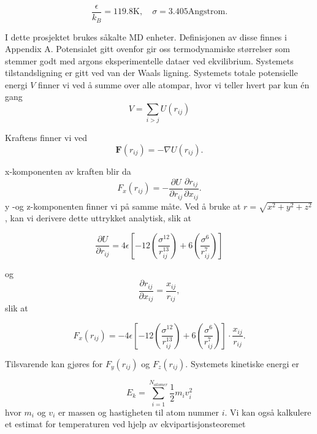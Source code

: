 \documentclass[paper=a4, fontsize=11pt]{scrartcl} %
\numberwithin{equation}{section} %
\numberwithin{figure}{section} %
\numberwithin{table}{section} %
\begin{document}
\begin{equation}
	\frac{\epsilon}{k_B} = 119.8\mathrm{K}, \quad \sigma=3.405 \mathrm{Angstrom}.
\end{equation}

I dette prosjektet brukes såkalte MD enheter. Definisjonen av disse finnes i Appendix A. Potensialet gitt ovenfor gir oss termodynamiske størrelser som stemmer godt med argons eksperimentelle dataer ved ekvilibrium. Systemets tilstandsligning er gitt ved van der Waals ligning. Systemets totale potensielle energi $V$ finner vi ved å summe over alle atompar, hvor vi teller hvert par kun én gang
\begin{equation}
V = \sum_{i>j} U(r_{ij})
\end{equation}

Kraftens  finner vi ved
\begin{equation}
\textbf{F}(r_{ij}) = - \nabla U(r_{ij}).
\end{equation}

x-komponenten av kraften blir da
\begin{equation}
F_x (r_{ij}) = -\frac{\partial U}{\partial r_{ij}} \frac{\partial r_{ij}}{\partial x_{ij}}.
\end{equation}
y -og z-komponenten finner vi på samme måte. Ved å bruke at $r = \sqrt{x^2 + y^2 + z^2}$, kan vi  derivere dette uttrykket analytisk, slik at 

\begin{equation}
\frac{\partial U}{\partial r_{ij}} = 4 \epsilon \left[ -12 \left( \frac{\sigma^{12}}{r_{ij}^{13}} \right) + 6 \left( \frac{\sigma^6}{r_{ij}^7} \right) \right]
\end{equation}

og 
\begin{equation}
\frac{\partial r_{ij}}{\partial x_{ij}} = \frac{x_{ij}}{r_{ij}},
\end{equation}
slik at 

\begin{equation}
F_x (r_{ij}) = - 4 \epsilon \left[ -12 \left( \frac{\sigma^{12}}{r_{ij}^{13}} \right) + 6 \left( \frac{\sigma^6}{r_{ij}^7} \right) \right] \cdot \frac{x_{ij}}{r_{ij}}.
\end{equation}


Tilsvarende kan gjøres for $F_y(r_{ij})$ og $F_z(r_{ij})$. Systemets kinetiske energi er 

\begin{equation}
E_k = \sum_{i=1}^{N_{atomer}} \frac{1}{2}m_iv_i^2
\end{equation}
hvor $m_i$ og $v_i$ er massen og hastigheten til atom nummer $i$. Vi kan også kalkulere et estimat for temperaturen ved hjelp av ekvipartisjonsteoremet 
\end{document}
